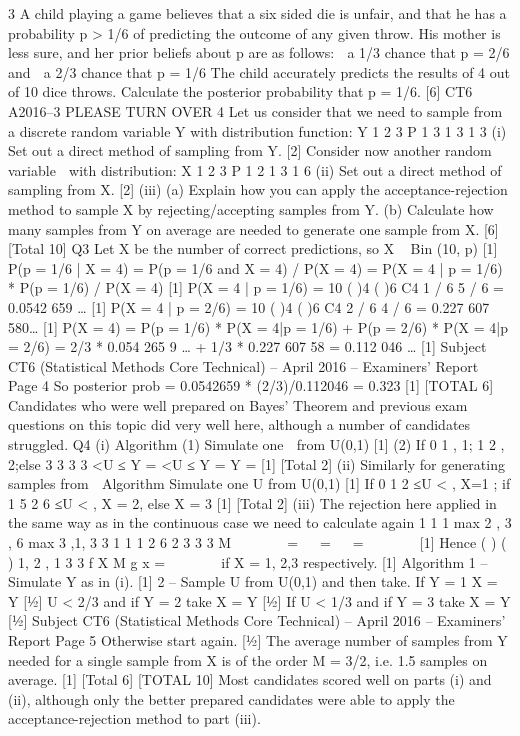 \documentclass[a4paper,12pt]{article}
\begin{document}
3 A child playing a game believes that a six sided die is unfair, and that he has a
probability p > 1/6 of predicting the outcome of any given throw. His mother is less
sure, and her prior beliefs about p are as follows:
   a 1/3 chance that p = 2/6 and
 a 2/3 chance that p = 1/6
The child accurately predicts the results of 4 out of 10 dice throws.
Calculate the posterior probability that p = 1/6. [6]
CT6 A2016–3 PLEASE TURN OVER
4 Let us consider that we need to sample from a discrete random variable Y with
distribution function:
  Y 1 2 3
P 1
3 1
3 1
3
(i) Set out a direct method of sampling from Y. [2]
Consider now another random variable 􀜺 with distribution:
  X 1 2 3
P 1
2 1
3 1
6
(ii) Set out a direct method of sampling from X. [2]
(iii) (a) Explain how you can apply the acceptance-rejection method to
sample X by rejecting/accepting samples from Y.
(b) Calculate how many samples from Y on average are needed to
generate one sample from X. [6]
[Total 10]
Q3 Let X be the number of correct predictions, so X ~ Bin (10, p) [1]
P(p = 1/6 | X = 4) = P(p = 1/6 and X = 4) / P(X = 4)
= P(X = 4 | p = 1/6) * P(p = 1/6) / P(X = 4) [1]
P(X = 4 | p = 1/6) = 10 ( )4 ( )6
C4 1 / 6 5 / 6 = 0.0542 659 … [1]
P(X = 4 | p = 2/6) = 10 ( )4 ( )6
C4 2 / 6 4 / 6 = 0.227 607 580… [1]
P(X = 4) = P(p = 1/6) * P(X = 4|p = 1/6) + P(p = 2/6) * P(X = 4|p = 2/6)
= 2/3 * 0.054 265 9 … + 1/3 * 0.227 607 58
= 0.112 046 … [1]
Subject CT6 (Statistical Methods Core Technical) – April 2016 – Examiners’ Report
Page 4
So posterior prob = 0.0542659 * (2/3)/0.112046 = 0.323 [1]
[TOTAL 6]
Candidates who were well prepared on Bayes’ Theorem and previous exam
questions on this topic did very well here, although a number of candidates
struggled.
Q4 (i) Algorithm
(1) Simulate one 􀜷 from U(0,1) [1]
(2) If 0 1 , 1; 1 2 , 2;else 3
3 3 3
<U ≤ Y = <U ≤ Y = Y = [1]
[Total 2]
(ii) Similarly for generating samples from 􀜺
Algorithm
Simulate one U from U(0,1) [1]
If 0 1
2
≤U < , X=1 ; if 1 5
2 6
≤U < , X = 2, else X = 3 [1]
[Total 2]
(iii) The rejection here applied in the same way as in the continuous case we need
to calculate again
1 1 1
max 2 , 3 , 6 max 3 ,1, 3 3 1 1 1 2 6 2
3 3 3
M
 
    =   =   =
     
 
[1]
Hence ( )
( )
1, 2 , 1
3 3
f X
M g x
=    
 
if X = 1, 2,3 respectively. [1]
Algorithm
1 – Simulate Y as in (i). [1]
2 – Sample U from U(0,1) and then take.
If Y = 1 X = Y [½]
U < 2/3 and if Y = 2 take X = Y [½]
If U < 1/3 and if Y = 3 take X = Y [½]
Subject CT6 (Statistical Methods Core Technical) – April 2016 – Examiners’ Report
Page 5
Otherwise start again. [½]
The average number of samples from Y needed for a single sample from X is
of the order M = 3/2, i.e. 1.5 samples on average. [1]
[Total 6]
[TOTAL 10]
Most candidates scored well on parts (i) and (ii), although only the better
prepared candidates were able to apply the acceptance-rejection method to
part (iii).
\end{document}
